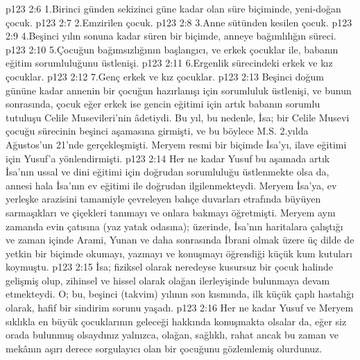 \vs p123 2:6 1.\bibnobreakspace Birinci günden sekizinci güne kadar olan süre biçiminde, yeni\hyp{}doğan çocuk.
\vs p123 2:7 2.\bibnobreakspace Emzirilen çocuk.
\vs p123 2:8 3.\bibnobreakspace Anne sütünden kesilen çocuk.
\vs p123 2:9 4.\bibnobreakspace Beşinci yılın sonuna kadar süren bir biçimde, anneye bağımlılığın süreci.
\vs p123 2:10 5.\bibnobreakspace Çocuğun bağımsızlığının başlangıcı, ve erkek çocuklar ile, babanın eğitim sorumluluğunu üstlenişi.
\vs p123 2:11 6.\bibnobreakspace Ergenlik sürecindeki erkek ve kız çocuklar.
\vs p123 2:12 7.\bibnobreakspace Genç erkek ve kız çocuklar.
\vs p123 2:13 Beşinci doğum gününe kadar annenin bir çocuğun hazırlanışı için sorumluluk üstlenişi, ve bunun sonrasında, çocuk eğer erkek ise gencin eğitimi için artık babanın sorumlu tutuluşu Celile Musevileri’nin âdetiydi. Bu yıl, bu nedenle, İsa; bir Celile Musevi çocuğu sürecinin beşinci aşamasına girmişti, ve bu böylece M.S. 2.yılda Ağustos’un 21’nde gerçekleşmişti. Meryem resmi bir biçimde İsa’yı, ilave eğitimi için Yusuf’a yönlendirmişti.
\vs p123 2:14 Her ne kadar Yusuf bu aşamada artık İsa’nın ussal ve dini eğitimi için doğrudan sorumluluğu üstlenmekte olsa da, annesi hala İsa’nın ev eğitimi ile doğrudan ilgilenmekteydi. Meryem İsa’ya, ev yerleşke arazisini tamamiyle çevreleyen bahçe duvarları etrafında büyüyen sarmaşıkları ve çiçekleri tanımayı ve onlara bakmayı öğretmişti. Meryem aynı zamanda evin çatısına (yaz yatak odasına); üzerinde, İsa’nın haritalara çalıştığı ve zaman içinde Arami, Yunan ve daha sonrasında İbrani olmak üzere üç dilde de yetkin bir biçimde okumayı, yazmayı ve konuşmayı öğrendiği küçük kum kutuları koymuştu.
\vs p123 2:15 İsa; fiziksel olarak neredeyse kusursuz bir çocuk halinde gelişmiş olup, zihinsel ve hissel olarak olağan ilerleyişinde bulunmaya devam etmekteydi. O; bu, beşinci (takvim) yılının son kısmında, ilk küçük çaplı hastalığı olarak, hafif bir sindirim sorunu yaşadı.
\vs p123 2:16 Her ne kadar Yusuf ve Meryem sıklıkla en büyük çocuklarının geleceği hakkında konuşmakta olsalar da, eğer siz orada bulunmuş olsaydınız yalnızca, olağan, sağlıklı, rahat ancak bu zaman ve mekânın aşırı derece sorgulayıcı olan bir çocuğunu gözlemlemiş olurdunuz.
